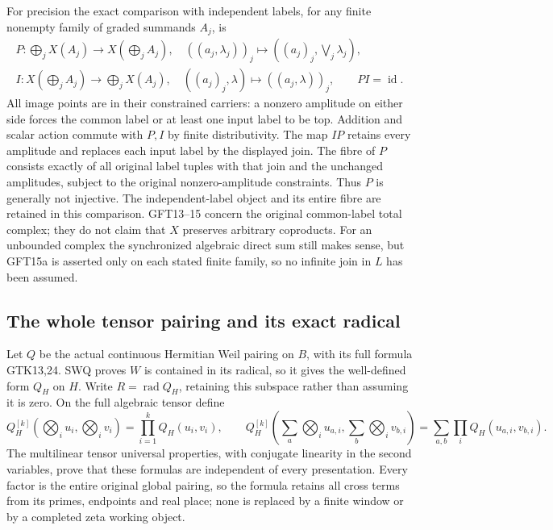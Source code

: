 For precision the exact comparison with independent labels, for
any finite nonempty family of graded summands $A_j$, is
\begin{equation}\tag{GFT15a}
 \begin{gathered}
 P:\bigoplus_j X(A_j)\longrightarrow X(\bigoplus_j A_j),
       \quad ((a_j,\lambda_j))_j\longmapsto
                         ((a_j)_j,\bigvee_j\lambda_j),\\
 I:X(\bigoplus_j A_j)\longrightarrow\bigoplus_jX(A_j),
       \quad((a_j)_j,\lambda)\longmapsto((a_j,\lambda))_j,
       \qquad PI=\operatorname{id}.
 \end{gathered}
\end{equation}
All image points are in their constrained carriers: a nonzero
amplitude on either side forces the common label or at least one
input label to be top. Addition and scalar action commute with
$P,I$ by finite distributivity. The map $IP$ retains every
amplitude and replaces each input label by the displayed join.
The fibre of $P$ consists exactly of all original label tuples
with that join and the unchanged amplitudes, subject to the
original nonzero-amplitude constraints. Thus $P$ is generally
not injective. The independent-label object and its entire fibre
are retained in this comparison. GFT13--15 concern the original
common-label total complex; they do not claim that $X$ preserves
arbitrary coproducts. For an unbounded complex the synchronized
algebraic direct sum still makes sense, but GFT15a is asserted
only on each stated finite family, so no infinite join in $L$
has been assumed.

\subsection{The whole tensor pairing and its exact radical}

Let $Q$ be the actual continuous Hermitian Weil pairing on $B$,
with its full formula GTK13,24. SWQ proves $W$ is contained in
its radical, so it gives the well-defined form $Q_H$ on $H$.
Write $R=\operatorname{rad}Q_H$, retaining this subspace rather
than assuming it is zero. On the full algebraic tensor define
\begin{equation}\tag{GFT16}
 Q_H^{[k]}\left(\bigotimes_i u_i,\bigotimes_i v_i\right)
       =\prod_{i=1}^k Q_H(u_i,v_i),\qquad
 Q_H^{[k]}\left(\sum_a\bigotimes_i u_{a,i},
                    \sum_b\bigotimes_i v_{b,i}\right)
       =\sum_{a,b}\prod_i Q_H(u_{a,i},v_{b,i}).
\end{equation}
The multilinear tensor universal properties, with conjugate
linearity in the second variables, prove that these formulas are
independent of every presentation. Every factor is the entire
original global pairing, so the formula retains all cross terms
from its primes, endpoints and real place; none is replaced by
a finite window or by a completed zeta working object.

